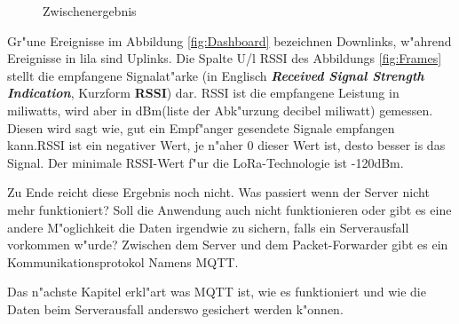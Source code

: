 	\begin{figure}[h!]
	
	\caption{Zwischenergebnis}
\end{figure}

\vspace{10cm}
Gr"une Ereignisse im Abbildung \ref{fig:Dashboard} bezeichnen Downlinks,
w"ahrend Ereignisse in lila sind Uplinks. Die Spalte U/l RSSI des
Abbildungs \ref{fig:Frames} stellt die empfangene Signalat"arke (in
Englisch \textbf{\textit{Received Signal Strength Indication}}, Kurzform
\textbf{RSSI}) dar. RSSI ist die empfangene Leistung in miliwatts, wird
aber in dBm(liste der Abk"urzung decibel miliwatt) gemessen. Diesen wird
sagt wie, gut ein Empf"anger gesendete Signale empfangen kann.RSSI ist
ein negativer Wert, je n"aher 0 dieser Wert ist, desto besser is das
Signal. Der minimale RSSI-Wert f"ur die LoRa-Technologie ist -120dBm.  


Zu Ende reicht diese Ergebnis noch nicht. Was passiert wenn der Server
nicht mehr funktioniert? Soll die Anwendung auch nicht funktionieren
oder gibt es eine andere M"oglichkeit die Daten irgendwie zu sichern,
falls ein Serverausfall vorkommen w"urde? Zwischen dem Server und dem
Packet-Forwarder gibt es ein Kommunikationsprotokol Namens MQTT. 

Das n"achste Kapitel erkl"art was MQTT ist, wie es funktioniert und wie die
Daten beim Serverausfall anderswo gesichert werden k"onnen. 
  
